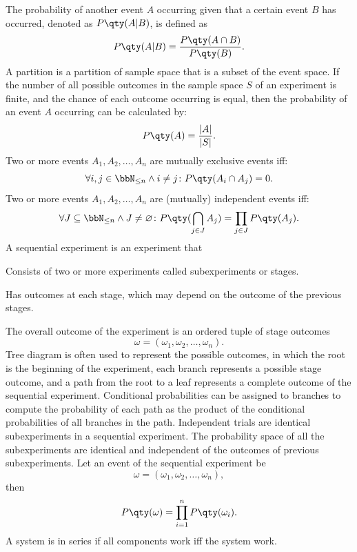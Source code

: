 \documentclass[a4paper,12pt]{report}
\begin{document}
\epr
{}
The probability of another event $A$ occurring given that a certain event $B$ has occurred, denoted as $P\qty(A|B)$, is defined as
\[P\qty(A|B)= \frac{P\qty(A\cap B)}{P\qty(B)}.\]
A partition is a partition of sample space that is a subset of the event space.
If the number of all possible outcomes in the sample space $S$ of an experiment is finite, and the chance of each outcome occurring is equal, then the probability of an event $A$ occurring can be calculated by:
\[P\qty(A)=\frac{|A|}{|S|}.\]
Two or more events $A_1,A_2,\ldots,A_n$ are mutually exclusive events iff:
\[\forall i,j\in\bbN_{\le n}\land i\ne j\colon P\qty(A_i\cap A_j)=0.\]
Two or more events $A_1,A_2,\ldots,A_n$ are (mutually) independent events iff:
\[\forall J\subseteq\bbN_{\leq n}\land J\neq\varnothing\colon P\qty(\bigcap_{j\in J} A_j)=\prod_{j\in J}P\qty(A_j).\]
A sequential experiment is an experiment that
\bit
\item Consists of two or more experiments called subexperiments or stages.
\item Has outcomes at each stage, which may depend on the outcome of the previous stages.
\item The overall outcome of the experiment is an ordered tuple of stage outcomes
\[\omega=(\omega_1,\omega_2,\ldots,\omega_n).\]
\eit
{}
Tree diagram is often used to represent the possible outcomes, in which the root is the beginning of the experiment, each branch represents a possible stage outcome, and a path from the root to a leaf represents a complete outcome of the sequential experiment. Conditional probabilities can be assigned to branches to compute the probability of each path as the product of the conditional probabilities of all branches in the path.
Independent trials are identical subexperiments in a sequential experiment. The probability space of all the subexperiments are identical and independent of the outcomes of previous subexperiments. Let an event of the sequential experiment be
\[\omega=(\omega_1,\omega_2,\ldots,\omega_n),\]
then
\[P\qty(\omega)=\prod_{i=1}^nP\qty(\omega_i).\]
A system is in series if all components work iff the system work.
\end{document}
